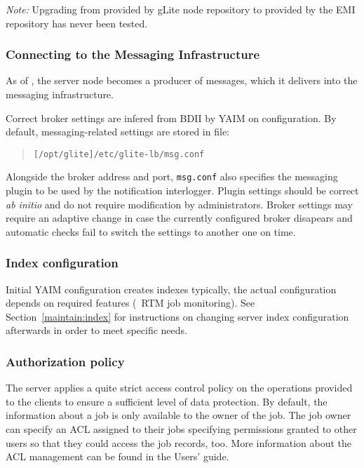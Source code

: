 \emph{Note:} Upgrading from  provided by gLite \LB node repository to  provided by the EMI repository has never been tested.


\subsubsection{Connecting to the Messaging Infrastructure}
\label{inst:messaging}

As of , the \LB server node becomes a producer of messages, which it delivers into the messaging infrastructure.

Correct broker settings are infered from BDII by YAIM on configuration. By default, messaging-related settings are stored in file:

  \begin{quote}
	\begin{verbatim}
[/opt/glite]/etc/glite-lb/msg.conf
	\end{verbatim}
  \end{quote}

Alongside the broker address and port, \texttt{msg.conf} also specifies the messaging plugin to be used by the notification interlogger. Plugin settings should be correct \emph{ab initio} and do not require modification by administrators. Broker settings may require an adaptive change in case the currently configured broker disapears and automatic checks fail to switch the settings to another one on time.


\subsubsection{Index configuration}

Initial YAIM configuration creates \LB indexes typically,
the actual configuration depends on required features (\eg\ RTM job monitoring).
See Section~\ref{maintain:index} for instructions
on changing \LB server index configuration afterwards in order
to meet specific needs.

\subsubsection{Authorization policy}
\label{inst:authz}
The \LB server applies a quite strict access control policy on the
operations provided to the clients to ensure a sufficient level of data
protection. By default, the information about a job is only available to the
owner of the job. The job owner can specify an ACL assigned to their jobs
specifying permissions granted to other users so that they could access the
job records, too. More information about the ACL management can be found in
the \LB Users' guide.

